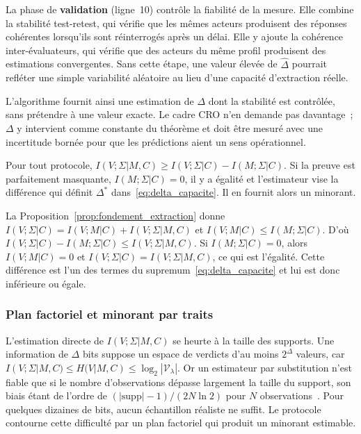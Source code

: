 \begin{sloppypar}
La phase de \textbf{validation} (ligne~10) contr\^ole la fiabilit\'e de la
mesure. Elle combine la stabilit\'e test-retest, qui
v\'erifie que les m\^emes acteurs produisent des r\'eponses coh\'erentes
lorsqu'ils sont r\'einterrog\'es apr\`es un d\'elai. Elle y ajoute la coh\'erence
inter-\'evaluateurs, qui v\'erifie que des acteurs du m\^eme profil
produisent des estimations convergentes. Sans cette \'etape, une valeur
\'elev\'ee de $\hat\Delta$ pourrait refl\'eter une simple variabilit\'e
al\'eatoire au lieu d'une capacit\'e d'extraction r\'eelle.

L'algorithme fournit ainsi une estimation de $\Delta$ dont la stabilit\'e est
contr\^ol\'ee, sans pr\'etendre \`a une valeur exacte. Le cadre CRO n'en demande
pas davantage~; $\Delta$ y intervient
comme constante du th\'eor\`eme et doit \^etre mesur\'e avec une incertitude
born\'ee pour que les pr\'edictions aient un sens op\'erationnel.

\begin{remark}
\label{rem:estimateur_masquant}
Pour tout protocole, $I(V;\Sigma|M,C) \geq I(V;\Sigma|C) - I(M;\Sigma|C)$. Si la preuve est
parfaitement masquante, $I(M;\Sigma|C) = 0$, il y a \'egalit\'e et l'estimateur
vise la diff\'erence qui d\'efinit $\Delta^*$ dans~\eqref{eq:delta_capacite}. Il en
fournit alors un minorant.
\end{remark}

\begin{Preuve}
La Proposition~\ref{prop:fondement_extraction} donne
$I(V;\Sigma|C) = I(V;M|C) + I(V;\Sigma|M,C)$ et $I(V;M|C) \leq I(M;\Sigma|C)$. D'o\`u
$I(V;\Sigma|C) - I(M;\Sigma|C) \leq I(V;\Sigma|M,C)$. Si $I(M;\Sigma|C) = 0$, alors
$I(V;M|C) = 0$ et $I(V;\Sigma|C) = I(V;\Sigma|M,C)$, ce qui est l'\'egalit\'e. Cette
diff\'erence est l'un des termes du supremum~\eqref{eq:delta_capacite} et lui est donc
inf\'erieure ou \'egale.
\end{Preuve}

\subsubsection{Plan factoriel et minorant par traits}
\label{subsubsec:plan_factoriel_delta}

L'estimation directe de $I(V;\Sigma|M,C)$ se heurte \`a la taille des supports. Une
information de $\Delta$ bits suppose un espace de verdicts d'au moins $2^\Delta$
valeurs, car $I(V;\Sigma|M,C) \leq H(V|M,C) \leq \log_2|\mathcal{V}_\lambda|$. Or un
estimateur par substitution n'est fiable que si le nombre d'observations d\'epasse
largement la taille du support, son biais \'etant de l'ordre de
$(|\mathrm{supp}|-1)/(2N\ln 2)$ pour $N$ observations~\cite{Paninski2003}. Pour quelques
dizaines de bits, aucun \'echantillon r\'ealiste ne suffit. Le protocole contourne
cette difficult\'e par un plan factoriel qui produit un minorant estimable.


\end{sloppypar}
